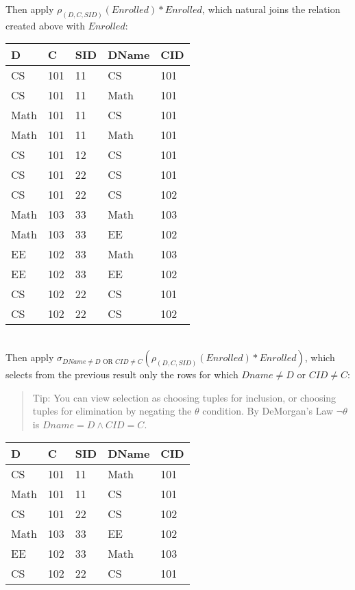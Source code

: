 \documentclass[10pt]{article}
\begin{document}
Then apply $\rho_{(D, C, SID)}(Enrolled) * Enrolled$, which natural joins the relation created above with $Enrolled$:\\

\begin{tabular}{|l|l|l|l|l|}\hline
\rowcolor{lightgray} D & C & SID & DName & CID \\\hline
CS & 101 & 11 & CS & 101 \\\hline
CS & 101 & 11 & Math & 101 \\\hline
Math & 101 & 11 & CS & 101 \\\hline
Math & 101 & 11 & Math & 101\\\hline
CS & 101 & 12 & CS & 101 \\\hline
CS & 101 & 22 & CS & 101 \\\hline
CS & 101 & 22 & CS & 102 \\\hline
Math & 103 & 33 & Math & 103\\\hline
Math & 103 & 33 & EE & 102 \\\hline
EE & 102 & 33 & Math & 103 \\\hline
EE & 102 & 33 & EE & 102 \\\hline
CS & 102 & 22 & CS & 101 \\\hline
CS & 102 & 22 & CS & 102 \\\hline
\end{tabular}\\

Then apply $\sigma_{DName \ne D \text{ OR } CID \ne C} (\rho_{(D, C, SID)}(Enrolled) * Enrolled)$, which selects from the previous result only the rows for which $Dname \ne D$ or $CID \ne C$:

\begin{quote}
Tip: You can view selection as choosing tuples for inclusion, or choosing tuples for elimination by negating the $\theta$ condition. By DeMorgan's Law $\lnot\theta$ is $Dname = D \land CID = C$.
\end{quote}

\begin{tabular}{|l|l|l|l|l|}\hline
\rowcolor{lightgray} D & C & SID & DName & CID \\\hline
CS & 101 & 11 & Math & 101 \\\hline
Math & 101 & 11 & CS & 101 \\\hline
CS & 101 & 22 & CS & 102 \\\hline
Math & 103 & 33 & EE & 102 \\\hline
EE & 102 & 33 & Math & 103 \\\hline
CS & 102 & 22 & CS & 101 \\\hline
\end{tabular}\\
\end{document}
